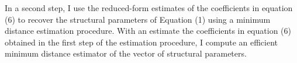 \documentclass[12pt]{article}
\begin{document}
In a second step, I use the reduced-form estimates of the coefficients in equation (6) to recover the structural parameters of Equation (1) using a minimum distance estimation procedure. With an estimate the coefficients in equation (6) obtained in the first step of the estimation procedure, I compute an efficient minimum distance estimator of the vector of structural parameters.







\singlespacing
\setlength\bibsep{0pt}












\end{document}
